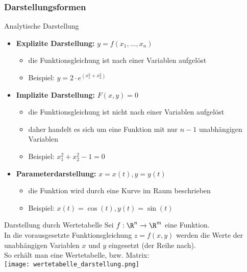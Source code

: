 \subsubsection{Darstellungsformen}

\begin{concept}{Analytische Darstellung}
    \begin{itemize}
        \item \textbf{Explizite Darstellung:} $y = f(x_1, \ldots, x_n)$
        \begin{itemize}
            \item die Funktionsgleichung ist nach einer Variablen aufgelöst
            \item Beispiel: $y = 2 \cdot e^(x_1^2 + x_2^2)$
        \end{itemize}
        \item \textbf{Implizite Darstellung:} $F(x, y) = 0$
        \begin{itemize}
            \item die Funktionsgleichung ist nicht nach einer Variablen aufgelöst
            \item daher handelt es sich um eine Funktion mit nur $n-1$ unabhängigen Variablen
            \item Beispiel: $x_1^2 + x_2^2 - 1 = 0$
        \end{itemize}
        \item \textbf{Parameterdarstellung:} $x = x(t), y = y(t)$
        \begin{itemize}
            \item die Funktion wird durch eine Kurve im Raum beschrieben
            \item Beispiel: $x(t) = \cos(t), y(t) = \sin(t)$
        \end{itemize}
    \end{itemize}
\end{concept}

\begin{concept}{Darstellung durch Wertetabelle}
    Sei $f: \R^n \to \R^m$ eine Funktion.\\
    In die vorausgesetzte Funktionsgleichung $z = f(x,y)$ werden die Werte der unabhängigen Variablen $x$ und $y$ eingesetzt (der Reihe nach).\\
    So erhält man eine Wertetabelle, bzw. Matrix:\\
    \texttt{[image: wertetabelle\_darstellung.png]}
\end{concept}

